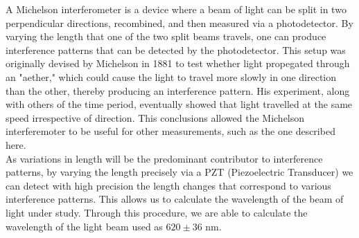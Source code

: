   A Michelson interferometer is a device where a beam of light can be split in two perpendicular directions, recombined, and then measured via a photodetector. By varying the length that one of the two split beams travels, one can produce interference patterns that can be detected by the photodetector. This setup was originally devised by Michelson in 1881 to test whether light propegated through an "aether," which could cause the light to travel more slowly in one direction than the other, thereby producing an interference pattern. His experiment, along with others of the time period, eventually showed that light travelled at the same speed irrespective of direction. This conclusions allowed the Michelson interferemoter to be useful for other measurements, such as the one described here.
  \\
  As variations in length will be the predominant contributor to interference patterns, by varying the length precisely via a PZT (Piezoelectric Transducer) we can detect with high precision the length changes that correspond to various interference patterns. This allows us to calculate the wavelength of the beam of light under study. Through this procedure, we are able to calculate the wavelength of the light beam used as $620 \pm 36$ nm.
  \\
